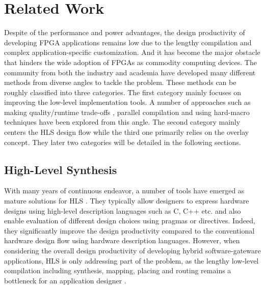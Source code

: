 \section{Related Work} \label{sec:relatedwork}
Despite of the performance and power advantages, the design 
productivity of developing FPGA applications remains low 
due to the lengthy compilation and complex application-specific 
customization. And it has become the major obstacle 
that hinders the wide adoption of FPGAs as commodity computing devices. 
The community from both the industry and academia have developed 
many different methods from diverse angles to tackle the problem. 
These methods can be roughly classified into three categories. 
The first category mainly focuses on improving the low-level 
implementation tools. A number of approaches such as making 
quality/runtime trade-offs \cite{mulpuri2001runtime}, parallel 
compilation \cite{moctar2014parallel, goeders2011deterministic, altera-pc, 
xilinx-pc} and using hard-macro techniques \cite{lavin2013improving, 
korf2011automatic} have been explored from this angle. The second 
category mainly centers the HLS design flow while the third one 
primarily relies on the overlay concept. They later two categories 
will be detailed in the following sections.

\subsection{High-Level Synthesis} 
With many years of continuous endeavor, a number of tools have emerged as 
mature solutions for HLS \cite{VivadoHLS, Legup, zhang2008autopilot}. They typically 
allow designers to express hardware designs using high-level  
description languages such as C, C++ etc. and also enable evaluation of different 
design choices using pragmas or directives. Indeed, they significantly improve 
the design productivity compared to the conventional hardware design flow using 
hardware description languages. However, when considering the overall design 
productivity of developing hybrid software-gateware applications, HLS is 
only addressing part of the problem, as the lengthy low-level compilation 
including synthesis, mapping, placing and routing remains a bottleneck for 
an application designer \cite{ROB2014, capalija2014tile}.


